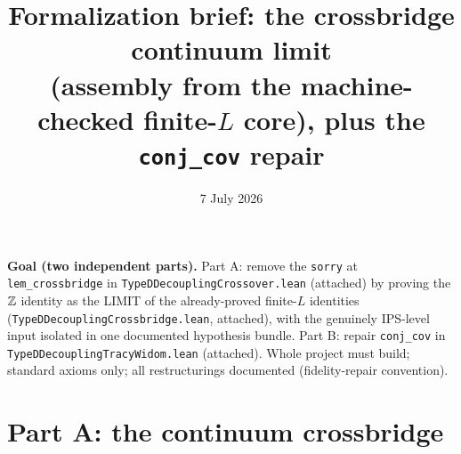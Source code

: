 \documentclass[11pt]{article}
\title{Formalization brief: the crossbridge continuum limit\\
(assembly from the machine-checked finite-$L$ core), plus the
\texttt{conj\_cov} repair}
\date{7 July 2026}
\theoremstyle{plain}
\theoremstyle{remark}
\begin{document}
\maketitle

\noindent\textbf{Goal (two independent parts).} Part A: remove the
\texttt{sorry} at \texttt{lem\_crossbridge} in
\texttt{TypeDDecouplingCrossover.lean} (attached) by proving the $\mathbb{Z}$ identity
as the LIMIT of the already-proved finite-$L$ identities
(\texttt{TypeDDecouplingCrossbridge.lean}, attached), with the genuinely
IPS-level input isolated in one documented hypothesis bundle. Part B: repair
\texttt{conj\_cov} in \texttt{TypeDDecouplingTracyWidom.lean} (attached).
Whole project must build; standard axioms only; all restructurings documented
(fidelity-repair convention).

\section*{Part A: the continuum crossbridge}
\end{document}
